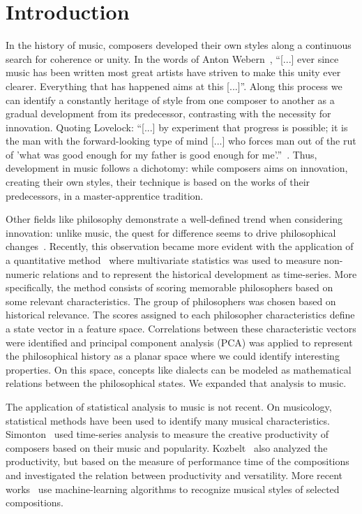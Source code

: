 \documentclass[
 aip,
 jmp,
 amsmath,amssymb,
 reprint,
]{revtex4-1}
\begin{document}
\section{\label{sec:level1}Introduction}

In the history of music, composers developed their own styles along a
continuous search for coherence or unity. In the words of Anton
Webern~\cite{Webern}, ``[...] ever since music has been written most great artists
have striven to make this unity ever clearer. Everything that has
happened aims at this [...]''. Along this process we can identify
a constantly heritage of style from one composer to another as
a gradual development from its
predecessor, contrasting with the necessity for innovation. Quoting
Lovelock: 
``[...] by experiment that progress is possible; it is the man
with the forward-looking type of mind [...] who forces man out of the
rut of 'what was good enough for my father is good enough for me'.''~\cite{Lovelock}.
Thus, development in music follows a dichotomy: while composers aims on
innovation, creating their own styles, their technique is based on the
works of their predecessors, in a master-apprentice tradition.

Other fields like philosophy demonstrate
a well-defined trend when considering innovation: unlike music, the
quest for difference seems to drive philosophical
changes~\cite{Deleuze}. Recently, this observation became more evident with
the application of a quantitative method~\cite{Fabbri} where
multivariate statistics was used to measure non-numeric relations and
to represent the historical development as time-series. More specifically, the method consists of
scoring memorable philosophers based on some relevant
characteristics. The group of philosophers was chosen
based on historical relevance. The
scores assigned to each philosopher characteristics define a state
vector in a feature space. Correlations between these
characteristic vectors were identified and principal component
analysis (PCA) was applied to
represent the philosophical history as a planar space where we could
identify interesting properties. On this space, concepts
like dialects can be modeled as mathematical relations between the
philosophical states. We
expanded that analysis to music.

The application of statistical analysis to
music is not recent. On musicology, statistical methods have been used
to identify many musical characteristics.
Simonton~\cite{Simonton1991829, Simonton1977791} used time-series analysis to measure the creative productivity
of composers based on their music and popularity. Kozbelt~\cite{Kozbelt01012009, Kozbelt01012007} also
analyzed the productivity, but based on the measure of performance
time of the compositions and investigated the relation between
productivity and versatility. More recent works~\cite{Kranenburg2004, Kranenburg2007} use machine-learning
algorithms to recognize musical styles of selected compositions.
\end{document}
